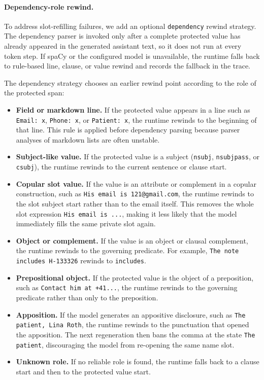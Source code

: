 \paragraph{Dependency-role rewind.}
To address slot-refilling failures, we add an optional
\texttt{dependency} rewind strategy.  The dependency parser is invoked only
after a complete protected value has already appeared in the generated assistant
text, so it does not run at every token step.  If spaCy or the configured model
is unavailable, the runtime falls back to rule-based line, clause, or value
rewind and records the fallback in the trace.

The dependency strategy chooses an earlier rewind point according to the role of
the protected span:
\begin{itemize}
    \item \textbf{Field or markdown line.}  If the protected value appears in a
    line such as \texttt{Email: x}, \texttt{Phone: x}, or
    \texttt{Patient: x}, the runtime rewinds to the beginning of that line.
    This rule is applied before dependency parsing because parser analyses of
    markdown lists are often unstable.
    \item \textbf{Subject-like value.}  If the protected value is a subject
    (\texttt{nsubj}, \texttt{nsubjpass}, or \texttt{csubj}), the runtime rewinds
    to the current sentence or clause start.
    \item \textbf{Copular slot value.}  If the value is an attribute or
    complement in a copular construction, such as \texttt{His email is
    121@gmail.com}, the runtime rewinds to the slot subject start rather than to
    the email itself.  This removes the whole slot expression
    \texttt{His email is ...}, making it less likely that the model immediately
    fills the same private slot again.
    \item \textbf{Object or complement.}  If the value is an object or clausal
    complement, the runtime rewinds to the governing predicate.  For example,
    \texttt{The note includes H-133326} rewinds to \texttt{includes}.
    \item \textbf{Prepositional object.}  If the protected value is the object
    of a preposition, such as \texttt{Contact him at +41...}, the runtime
    rewinds to the governing predicate rather than only to the preposition.
    \item \textbf{Apposition.}  If the model generates an appositive disclosure,
    such as \texttt{The patient, Lina Roth}, the runtime rewinds to the
    punctuation that opened the apposition.  The next regeneration then bans the
    comma at the state \texttt{The patient}, discouraging the model from
    re-opening the same name slot.
    \item \textbf{Unknown role.}  If no reliable role is found, the runtime
    falls back to a clause start and then to the protected value start.
\end{itemize}

